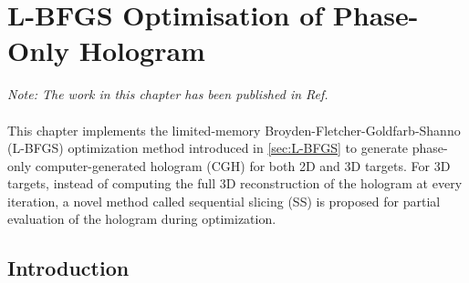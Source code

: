 \chapter{L-BFGS Optimisation of Phase-Only Hologram}\label{L-BFGS Optimisation of Phase-Only Hologram}

\graphicspath{{Chapter_Optim2D/Figs/}}

\textit{Note: The work in this chapter has been published in Ref. \cite{Sha2023}}\\\\

This chapter implements the limited-memory Broyden-Fletcher-Goldfarb-Shanno (L-BFGS) optimization method introduced in \cref{sec:L-BFGS} to generate phase-only computer-generated hologram (CGH) for both 2D and 3D targets. For 3D targets, instead of computing the full 3D reconstruction of the hologram at every iteration, a novel method called sequential slicing (SS) is proposed for partial evaluation of the hologram during optimization.

\section{Introduction}


